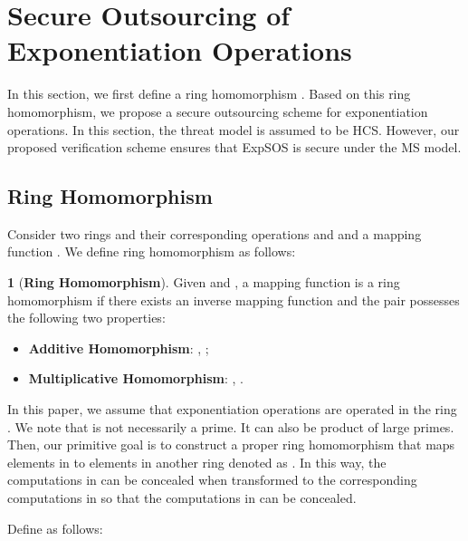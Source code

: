 \documentclass[english,draftcls,onecolumn,11pt]{IEEEtran}
\theoremstyle{definition}
\newtheorem{defn}{\protect\definitionname}
\theoremstyle{plain}
\theoremstyle{plain}
\theoremstyle{definition}
\providecommand{\definitionname}{Definition}
\begin{document}
\section{Secure Outsourcing of Exponentiation Operations \label{sec:Proposed-Scheme}}

In this section, we first define a ring homomorphism .
Based on this ring homomorphism, we propose a secure outsourcing scheme
for exponentiation operations. In this section, the threat model is
assumed to be HCS.\textcolor{red}{{} }However, our proposed verification
scheme ensures that ExpSOS is secure under the MS model.


\subsection{Ring Homomorphism}

Consider two rings and their corresponding operations 
and  and a mapping function .
We define ring homomorphism as follows:
\begin{defn}[\textbf{Ring Homomorphism}]
 Given  and ,
a mapping function 
is a ring homomorphism if there exists an inverse mapping function
 and the pair 
possesses the following two properties:\end{defn}
\begin{itemize}
\item \textbf{Additive Homomorphism}: ,
;
\item \textbf{Multiplicative Homomorphism}: ,
.
\end{itemize}
In this paper, we assume that exponentiation operations are operated
in the ring . We note that  is not necessarily
a prime. It can also be product of large primes. Then, our primitive
goal is to construct a proper ring homomorphism 
that maps elements in  to elements in another ring
denoted as . In this way, the computations in 
can be concealed when transformed to the corresponding computations
in  so that the computations in 
can be concealed. 

Define  as follows:
\end{document}
